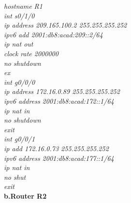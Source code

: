 \documentclass[a4paper, 12pt]{article}
\begin{document}
\hspace*{2cm}\textit{hostname R1\\
\hspace*{2cm}int s0/1/0\\
\hspace*{2cm}ip address 209.165.100.2 255.255.255.252\\
\hspace*{2cm}ipv6 add 2001:db8:acad:209::2/64\\
\hspace*{2cm}ip nat out\\
\hspace*{2cm}clock rate 2000000\\
\hspace*{2cm}no shutdown\\
\hspace*{2cm}ex\\
\hspace*{2cm}int g0/0/0\\
\hspace*{2cm}ip address 172.16.0.89 255.255.255.252\\
\hspace*{2cm}ipv6 address 2001:db8:acad:172::1/64\\
\hspace*{2cm}ip nat in\\
\hspace*{2cm}no shutdown\\
\hspace*{2cm}exit\\
\hspace*{2cm}int g0/0/1\\
\hspace*{2cm}ip add 172.16.0.73 255.255.255.252\\
\hspace*{2cm}ipv6 address 2001:db8:acad:177::1/64\\
\hspace*{2cm}ip nat in\\
\hspace*{2cm}no shut\\
\hspace*{2cm}exit\\}
\hspace*{1cm}\textbf{b.Router R2} \\
\end{document}
